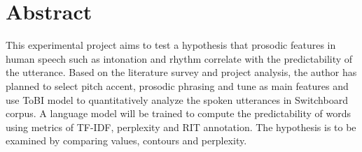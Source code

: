 \chapter*{\Large \center Abstract}


This experimental project aims to test a hypothesis that prosodic features in human speech such as intonation and rhythm correlate with the predictability of the utterance. Based on the literature survey and project analysis, the author has planned to select pitch accent, prosodic phrasing and tune as main features and use ToBI model to quantitatively analyze the spoken utterances in Switchboard corpus. A language model will be trained to compute the predictability of words using metrics of TF-IDF, perplexity and RIT annotation. The hypothesis is to be examined by comparing values, contours and perplexity.